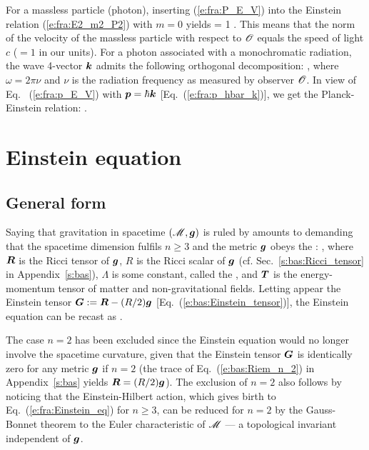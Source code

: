 For a massless particle (photon), inserting (\ref{e:fra:P_E_V}) into the
Einstein relation (\ref{e:fra:E2_m2_P2}) with $m=0$ yields
\be \label{e:fra:photon_V_one}
    \cdot{} = 1 .
\ee
This means that the norm of the velocity of the massless particle with respect to $\mathscr{O}$
equals the speed of light $c$ ($=1$ in our units).
For a photon associated with a monochromatic radiation, the wave 4-vector $\bm{k}$
admits the following orthogonal decomposition:
\be
   ,
\ee
where $\omega = 2\pi \nu$ and $\nu$ is the radiation frequency as measured by
observer $\mathscr{O}$. In view of Eq.~ (\ref{e:fra:p_E_V}) with $\bm{p} = \hbar\bm{k}$
[Eq.~(\ref{e:fra:p_hbar_k})], we
get the Planck-Einstein relation:
\be \label{e:fra:Planck_Einstein}
    .
\ee

\section{Einstein equation} \label{s:fra:Einstein_eq}

\subsection{General form}

Saying that gravitation in spacetime $(\mathscr{M}, \bm{g})$ is ruled by
 amounts
to demanding that the spacetime dimension fulfils $n\geq 3$ and
the metric $\bm{g}$ obeys the :
\be \label{e:fra:Einstein_eq}
    ,
\ee
where $\bm{R}$ is the Ricci tensor of $\bm{g}$, $R$ is the
Ricci scalar of $\bm{g}$
(cf. Sec.~\ref{s:bas:Ricci_tensor} in Appendix~\ref{s:bas}), $\Lambda$ is some
constant, called the ,
and $\bm{T}$ is the energy-momentum tensor of
matter and non-gravitational fields. Letting appear the
Einstein tensor $\bm{G} := \bm{R} - (R/2) \bm{g}$
[Eq.~(\ref{e:bas:Einstein_tensor})], the Einstein equation can be recast as
\be \label{e:fra:Einstein_eq_G}
    .
\ee

\begin{remark} \label{r:fra:Einstein_eq_n_2}
The case $n=2$ has been excluded since the Einstein equation would
no longer involve the spacetime curvature, given that the Einstein tensor
$\bm{G}$ is identically zero for any metric $\bm{g}$ if $n=2$
(the trace of Eq.~(\ref{e:bas:Riem_n_2}) in Appendix~\ref{s:bas} yields
$\bm{R} = (R/2) \bm{g}$).
The exclusion of $n=2$ also follows by noticing that
the Einstein-Hilbert action,
which gives birth to Eq.~(\ref{e:fra:Einstein_eq})
for $n\geq 3$, can be reduced for $n=2$
by the Gauss-Bonnet theorem to the
Euler characteristic
of $\mathscr{M}$ --- a topological invariant independent of $\bm{g}$.
\end{remark}

